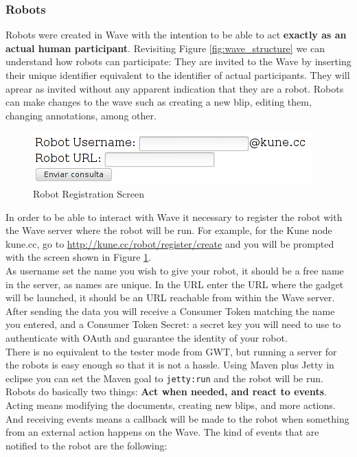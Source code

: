 \subsubsection{Robots}
Robots were created in Wave with the intention to be able to act \textbf{exactly as an actual human participant}. Revisiting Figure \ref{fig:wave_structure} we can understand how robots can participate: They are invited to the Wave by inserting their unique identifier equivalent to the identifier of actual participants. They will aprear as invited without any apparent indication that they are a robot. Robots can make changes to the wave such as creating a new blip, editing them, changing annotations, among other.\\[.2cm]
\begin{figure}[h]
  \center
    \includegraphics[keepaspectratio, scale=0.6]{Media/Captures/Wave/RegisterRobot.png}
  \caption{Robot Registration Screen}
  \label{fig:robot_register}
\end{figure}
In order to be able to interact with Wave it necessary to register the robot with the Wave server where the robot will be run. For example, for the Kune node kune.cc, go to \url{http://kune.cc/robot/register/create} and you will be prompted with the screen shown in Figure \ref{fig:robot_register}.\\[.2cm]
As username set the name you wish to give your robot, it should be a free name in the server, as names are unique. In the URL enter the URL where the gadget will be launched, it should be an URL reachable from within the Wave server. After sending the data you will receive a Consumer Token matching the name you entered, and a Consumer Token Secret: a secret key you will need to use to authenticate with OAuth and guarantee the identity of your robot.\\[.2cm]
There is no equivalent to the tester mode from GWT, but running a server for the robots is easy enough so that it is not a hassle. Using Maven plus Jetty in eclipse you can set the Maven goal to \verb|jetty:run| and the robot will be run.\\[.2cm]
Robots do basically two things: \textbf{Act when needed, and react to events}. Acting means modifying the documents, creating new blips, and more actions. And receiving events means a callback will be made to the robot when something from an external action happens on the Wave. The kind of events that are notified to the robot are the following:
